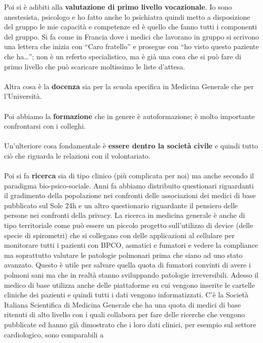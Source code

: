 Poi si è adibiti alla \textbf{valutazione di primo livello vocazionale}.
Io sono anestesista, psicologo e ho fatto anche lo psichiatra quindi
metto a disposizione del gruppo le mie capacità e competenze ed è quello
che fanno tutti i componenti del gruppo. Si fa come in Francia dove i
medici che lavorano in gruppo si scrivono una lettera che inizia con
``Caro fratello'' e prosegue con ``ho visto questo paziente che
ha\ldots{}''; non è un referto specialistico, ma è già una cosa che si
può fare di primo livello che può scaricare moltissimo le liste
d'attesa.
\\\\
Altra cosa è la \textbf{docenza} sia per la scuola specifica in Medicina
Generale che per l'Università.
\\\\
Poi abbiamo la \textbf{formazione} che in genere è autoformazione; è
molto importante confrontarsi con i colleghi.
\\\\
Un'ulteriore cosa fondamentale è \textbf{essere dentro la società
civile} e quindi tutto ciò che riguarda le relazioni con il
volontariato.
\\\\
Poi si fa \textbf{ricerca} sia di tipo clinico (più complicata per noi)
ma anche secondo il paradigma bio-psico-sociale. Anni fa abbiamo
distribuito questionari riguardanti il gradimento della popolazione nei
confronti delle associazioni dei medici di base pubblicato sul Sole 24h
e un altro questionario riguardante il pensiero delle persone nei
confronti della privacy. La ricerca in medicina generale è anche di tipo
territoriale come può essere un piccolo progetto sull'utilizzo di device
(delle specie di spirometri) che si collegano con delle applicazioni al
cellulare per monitorare tutti i pazienti con BPCO, asmatici e fumatori
e vedere la compliance ma soprattutto valutare le patologie polmonari
prima che siano ad uno stato avanzato. Questo è utile per salvare quella
quota di fumatori convinti di avere i polmoni sani ma che in realtà
stanno sviluppando patologie irreversibili. Adesso il medico di base
utilizza anche delle piattaforme su cui vengono inserite le cartelle
cliniche dei pazienti e quindi tutti i dati vengono informatizzati. C'è
la Società Italiana Scientifica di Medicina Generale che ha una quota di
medici di base ritenuti di alto livello con i quali collabora per fare
delle ricerche che vengono pubblicate ed hanno già dimostrato che i loro
dati clinici, per esempio sul settore cardiologico, sono comparabili a
